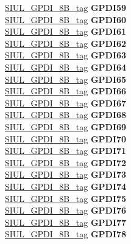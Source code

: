 \begin{DoxyCompactItemize}
\begin{tabbing}
\>\>\mbox{\hyperlink{unionSIUL__GPDI__8B__tag}{SIUL\_GPDI\_8B\_tag}} {\bfseries GPDI59}\\
\>\>\mbox{\hyperlink{unionSIUL__GPDI__8B__tag}{SIUL\_GPDI\_8B\_tag}} {\bfseries GPDI60}\\
\>\>\mbox{\hyperlink{unionSIUL__GPDI__8B__tag}{SIUL\_GPDI\_8B\_tag}} {\bfseries GPDI61}\\
\>\>\mbox{\hyperlink{unionSIUL__GPDI__8B__tag}{SIUL\_GPDI\_8B\_tag}} {\bfseries GPDI62}\\
\>\>\mbox{\hyperlink{unionSIUL__GPDI__8B__tag}{SIUL\_GPDI\_8B\_tag}} {\bfseries GPDI63}\\
\>\>\mbox{\hyperlink{unionSIUL__GPDI__8B__tag}{SIUL\_GPDI\_8B\_tag}} {\bfseries GPDI64}\\
\>\>\mbox{\hyperlink{unionSIUL__GPDI__8B__tag}{SIUL\_GPDI\_8B\_tag}} {\bfseries GPDI65}\\
\>\>\mbox{\hyperlink{unionSIUL__GPDI__8B__tag}{SIUL\_GPDI\_8B\_tag}} {\bfseries GPDI66}\\
\>\>\mbox{\hyperlink{unionSIUL__GPDI__8B__tag}{SIUL\_GPDI\_8B\_tag}} {\bfseries GPDI67}\\
\>\>\mbox{\hyperlink{unionSIUL__GPDI__8B__tag}{SIUL\_GPDI\_8B\_tag}} {\bfseries GPDI68}\\
\>\>\mbox{\hyperlink{unionSIUL__GPDI__8B__tag}{SIUL\_GPDI\_8B\_tag}} {\bfseries GPDI69}\\
\>\>\mbox{\hyperlink{unionSIUL__GPDI__8B__tag}{SIUL\_GPDI\_8B\_tag}} {\bfseries GPDI70}\\
\>\>\mbox{\hyperlink{unionSIUL__GPDI__8B__tag}{SIUL\_GPDI\_8B\_tag}} {\bfseries GPDI71}\\
\>\>\mbox{\hyperlink{unionSIUL__GPDI__8B__tag}{SIUL\_GPDI\_8B\_tag}} {\bfseries GPDI72}\\
\>\>\mbox{\hyperlink{unionSIUL__GPDI__8B__tag}{SIUL\_GPDI\_8B\_tag}} {\bfseries GPDI73}\\
\>\>\mbox{\hyperlink{unionSIUL__GPDI__8B__tag}{SIUL\_GPDI\_8B\_tag}} {\bfseries GPDI74}\\
\>\>\mbox{\hyperlink{unionSIUL__GPDI__8B__tag}{SIUL\_GPDI\_8B\_tag}} {\bfseries GPDI75}\\
\>\>\mbox{\hyperlink{unionSIUL__GPDI__8B__tag}{SIUL\_GPDI\_8B\_tag}} {\bfseries GPDI76}\\
\>\>\mbox{\hyperlink{unionSIUL__GPDI__8B__tag}{SIUL\_GPDI\_8B\_tag}} {\bfseries GPDI77}\\
\>\>\mbox{\hyperlink{unionSIUL__GPDI__8B__tag}{SIUL\_GPDI\_8B\_tag}} {\bfseries GPDI78}\\

\end{tabbing}
\end{DoxyCompactItemize}
